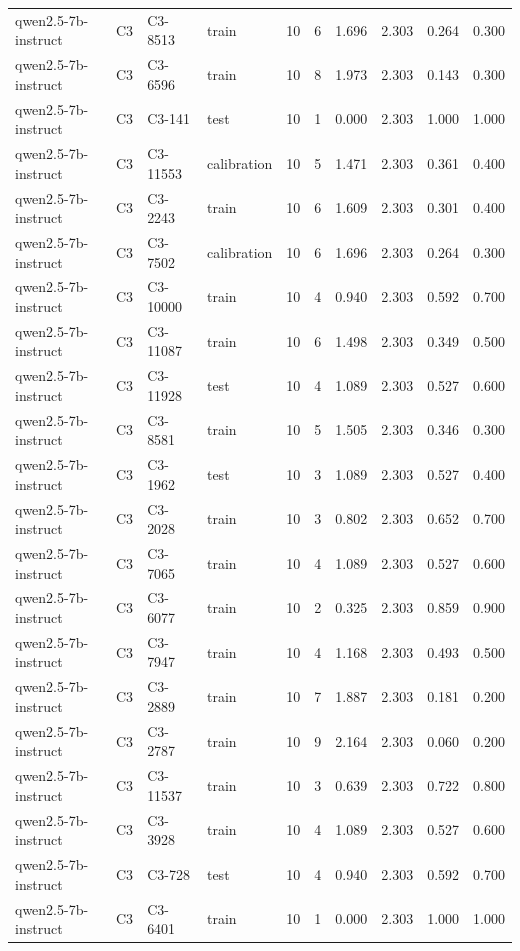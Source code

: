 \begin{table}
\begin{tabular}{llllrrrrrr}
qwen2.5-7b-instruct & C3 & C3-8513 & train & 10 & 6 & 1.696 & 2.303 & 0.264 & 0.300 \\
qwen2.5-7b-instruct & C3 & C3-6596 & train & 10 & 8 & 1.973 & 2.303 & 0.143 & 0.300 \\
qwen2.5-7b-instruct & C3 & C3-141 & test & 10 & 1 & 0.000 & 2.303 & 1.000 & 1.000 \\
qwen2.5-7b-instruct & C3 & C3-11553 & calibration & 10 & 5 & 1.471 & 2.303 & 0.361 & 0.400 \\
qwen2.5-7b-instruct & C3 & C3-2243 & train & 10 & 6 & 1.609 & 2.303 & 0.301 & 0.400 \\
qwen2.5-7b-instruct & C3 & C3-7502 & calibration & 10 & 6 & 1.696 & 2.303 & 0.264 & 0.300 \\
qwen2.5-7b-instruct & C3 & C3-10000 & train & 10 & 4 & 0.940 & 2.303 & 0.592 & 0.700 \\
qwen2.5-7b-instruct & C3 & C3-11087 & train & 10 & 6 & 1.498 & 2.303 & 0.349 & 0.500 \\
qwen2.5-7b-instruct & C3 & C3-11928 & test & 10 & 4 & 1.089 & 2.303 & 0.527 & 0.600 \\
qwen2.5-7b-instruct & C3 & C3-8581 & train & 10 & 5 & 1.505 & 2.303 & 0.346 & 0.300 \\
qwen2.5-7b-instruct & C3 & C3-1962 & test & 10 & 3 & 1.089 & 2.303 & 0.527 & 0.400 \\
qwen2.5-7b-instruct & C3 & C3-2028 & train & 10 & 3 & 0.802 & 2.303 & 0.652 & 0.700 \\
qwen2.5-7b-instruct & C3 & C3-7065 & train & 10 & 4 & 1.089 & 2.303 & 0.527 & 0.600 \\
qwen2.5-7b-instruct & C3 & C3-6077 & train & 10 & 2 & 0.325 & 2.303 & 0.859 & 0.900 \\
qwen2.5-7b-instruct & C3 & C3-7947 & train & 10 & 4 & 1.168 & 2.303 & 0.493 & 0.500 \\
qwen2.5-7b-instruct & C3 & C3-2889 & train & 10 & 7 & 1.887 & 2.303 & 0.181 & 0.200 \\
qwen2.5-7b-instruct & C3 & C3-2787 & train & 10 & 9 & 2.164 & 2.303 & 0.060 & 0.200 \\
qwen2.5-7b-instruct & C3 & C3-11537 & train & 10 & 3 & 0.639 & 2.303 & 0.722 & 0.800 \\
qwen2.5-7b-instruct & C3 & C3-3928 & train & 10 & 4 & 1.089 & 2.303 & 0.527 & 0.600 \\
qwen2.5-7b-instruct & C3 & C3-728 & test & 10 & 4 & 0.940 & 2.303 & 0.592 & 0.700 \\
qwen2.5-7b-instruct & C3 & C3-6401 & train & 10 & 1 & 0.000 & 2.303 & 1.000 & 1.000 \\

\end{tabular}
\end{table}
